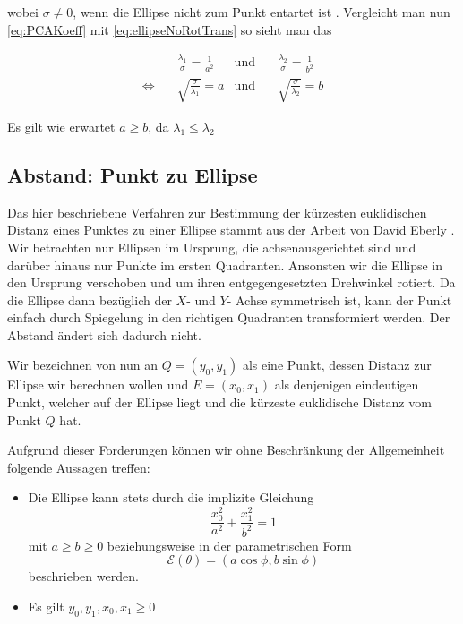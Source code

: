 wobei $\sigma \neq 0$, wenn die Ellipse nicht zum Punkt entartet ist \cite{Lawrence1972}. Vergleicht man nun \ref{eq:PCAKoeff} mit \ref{eq:ellipseNoRotTrans} so sieht man das

\begin{equation}
\begin{aligned}
&\frac{\lambda_1}{\sigma} = \frac{1}{a^2} &\text{und}\quad &\frac{\lambda_2}{\sigma} = \frac{1}{b^2}\\
\Leftrightarrow\quad & \sqrt{\frac{\sigma}{\lambda_1}}  = a  &\text{und}\quad & \sqrt{\frac{\sigma}{\lambda_2}}  = b
\end{aligned}
\end{equation}

Es gilt wie erwartet $a \geq b$, da $\lambda_1 \leq \lambda_2$


\subsection{Abstand: Punkt zu Ellipse}
\label{sc:distPointEllipse}
Das hier beschriebene Verfahren zur Bestimmung der kürzesten euklidischen Distanz eines Punktes zu einer Ellipse stammt aus der Arbeit von David Eberly \cite{Eberly2013}.
Wir betrachten nur Ellipsen im Ursprung, die achsenausgerichtet sind und darüber hinaus nur Punkte im ersten Quadranten. Ansonsten wir die Ellipse in den Ursprung verschoben und um ihren entgegengesetzten Drehwinkel rotiert. Da die Ellipse dann bezüglich der $X$- und $Y$- Achse symmetrisch ist, kann der Punkt einfach durch Spiegelung in den richtigen Quadranten transformiert werden. Der Abstand ändert sich dadurch nicht. 

Wir bezeichnen von nun an $Q = (y_0, y_1)$ als eine Punkt, dessen Distanz zur Ellipse wir berechnen wollen und $E = (x_0, x_1)$ als denjenigen eindeutigen Punkt, welcher auf der Ellipse liegt und die kürzeste euklidische Distanz vom Punkt $Q$ hat. 

Aufgrund dieser Forderungen können wir ohne Beschränkung der Allgemeinheit folgende Aussagen treffen:
\begin{itemize}
	\item Die Ellipse kann stets durch die implizite Gleichung 
	\begin{equation}\label{eq:distEqParam} \frac{x_0^2}{a^2} + \frac{x_1^2}{b^2} = 1\end{equation}
	 mit $a \geq b \geq 0$ beziehungsweise
	in der parametrischen Form \[\mathcal{E}(\theta) = (a\cos\phi, b\sin\phi)  \tag*{$\phi \in [0, 2\pi)$}\] beschrieben werden.
	\item Es gilt $y_0,y_1,x_0, x_1 \geq 0$
\end{itemize}

